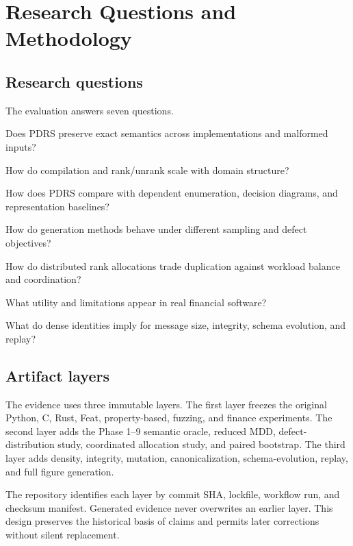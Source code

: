 \section{Research Questions and Methodology}\label{sec:method}
\subsection{Research questions}
The evaluation answers seven questions.
\begin{description}[style=nextline,leftmargin=1.3cm,labelwidth=1.0cm]
  \item[RQ1] Does PDRS preserve exact semantics across implementations and malformed inputs?
  \item[RQ2] How do compilation and rank/unrank scale with domain structure?
  \item[RQ3] How does PDRS compare with dependent enumeration, decision diagrams, and representation baselines?
  \item[RQ4] How do generation methods behave under different sampling and defect objectives?
  \item[RQ5] How do distributed rank allocations trade duplication against workload balance and coordination?
  \item[RQ6] What utility and limitations appear in real financial software?
  \item[RQ7] What do dense identities imply for message size, integrity, schema evolution, and replay?
\end{description}

\subsection{Artifact layers}
The evidence uses three immutable layers. The first layer freezes the original Python, C, Rust, Feat, property-based, fuzzing, and finance experiments. The second layer adds the Phase 1--9 semantic oracle, reduced MDD, defect-distribution study, coordinated allocation study, and paired bootstrap. The third layer adds density, integrity, mutation, canonicalization, schema-evolution, replay, and full figure generation.

The repository identifies each layer by commit SHA, lockfile, workflow run, and checksum manifest. Generated evidence never overwrites an earlier layer. This design preserves the historical basis of claims and permits later corrections without silent replacement.

